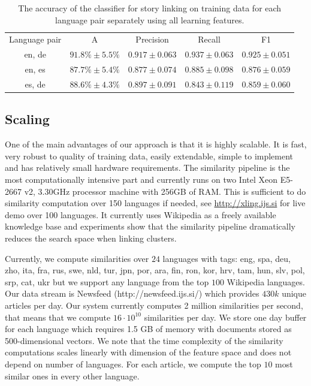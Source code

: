 \documentclass[twoside,11pt]{article}
\begin{document}
\begin{table}[h]
\caption{The accuracy of the classifier for story linking on training data for each language pair separately using all learning features.}
\label{table:langPairEval}
\begin{center}
\begin{tabular}{|c|c|c|c|c|}
  \hline
  \cline{1-5}
  Language pair & A & Precision & Recall & F1 \\ \cline{1-5}
  en, de & $91.8\% \pm 5.5\%$ & $0.917 \pm 0.063$ & $0.937 \pm 0.063$ & $0.925 \pm 0.051$ \\ \cline{1-5}
  en, es & $87.7\% \pm 5.4\%$ & $0.877 \pm 0.074$ & $0.885 \pm 0.098$ & $0.876 \pm 0.059$ \\ \cline{1-5}
  es, de & $88.6\% \pm 4.3\%$ & $0.897 \pm 0.091$ & $0.843 \pm 0.119$ & $0.859 \pm 0.060$ \\ \cline{1-5}
  \hline
\end{tabular}
\end{center}
\end{table}

\subsection{Scaling}
One of the main advantages of our approach is that it is highly scalable. It is fast, very robust to quality of training data, easily extendable, simple to implement and has relatively small hardware requirements. The similarity pipeline is the most computationally intensive part and currently runs on two Intel Xeon E5-2667 v2, 3.30GHz processor machine with 256GB of RAM. This is sufficient to do similarity computation over 150 languages if needed, see \url{http://xling.ijs.si} for live demo over 100 languages. It currently uses Wikipedia as a freely available knowledge base and experiments show that the similarity pipeline dramatically reduces the search space when linking clusters.

Currently, we compute similarities over $24$ languages with tags: eng, spa, deu, zho, ita, fra, rus, swe, nld, tur, jpn, por, ara, fin, ron, kor, hrv, tam, hun, slv, pol, srp, cat, ukr but we support any language from the top $100$ Wikipedia languages. Our data stream is Newsfeed (http://newsfeed.ijs.si/) which provides $430k$ unique articles per day. Our system currently computes 2 million similarities per second, that means that we compute $16 \cdot 10^{10}$ similarities per day. We
store one day buffer for each language which requires 1.5 GB of memory with documents   stored as 500-dimensional vectors. We  note that the time complexity of the similarity computations scales linearly with dimension of the feature space and does not  depend on number of languages. For each article, we compute the top $10$  most similar ones in every other language.
\end{document}
